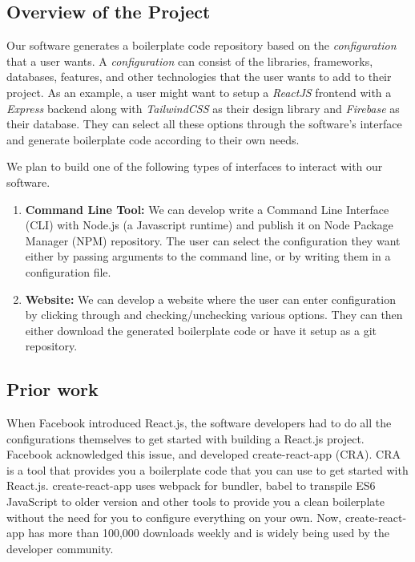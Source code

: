 \subsection{Overview of the Project}

Our software generates a boilerplate code repository based on the \emph{configuration} that a user wants. A \emph{configuration} can consist of the libraries, frameworks, databases, features, and other technologies that the user wants to add to their project. As an example, a user might want to setup a \emph{ReactJS} frontend with a \emph{Express} backend along with \emph{TailwindCSS} as their design library and \emph{Firebase} as their database. They can select all these options through the software's interface and generate boilerplate code according to their own needs.

We plan to build one of the following types of interfaces to interact with our software.
\begin{enumerate}
  \item \textbf{Command Line Tool:} We can develop write a Command Line Interface (CLI) with Node.js (a Javascript runtime) and publish it on Node Package Manager (NPM) repository. The user can select the configuration they want either by passing arguments to the command line, or by writing them in a configuration file.
  \item \textbf{Website:} We can develop a website where the user can enter configuration by clicking through and checking/unchecking various options. They can then either download the generated boilerplate code or have it setup as a git repository.
\end{enumerate}

\subsection{Prior work}

When Facebook introduced React.js, the software developers had to do all the configurations themselves to get started with building a React.js project. Facebook acknowledged this issue, and developed create-react-app (CRA). CRA is a tool that provides you a boilerplate code that you can use to get started with React.js.  create-react-app uses webpack for bundler, babel to transpile ES6 JavaScript to older version and other tools to provide you a clean boilerplate without the need for you to configure everything on your own. Now, create-react-app has more than 100,000 downloads weekly and is widely being used by the developer community.

